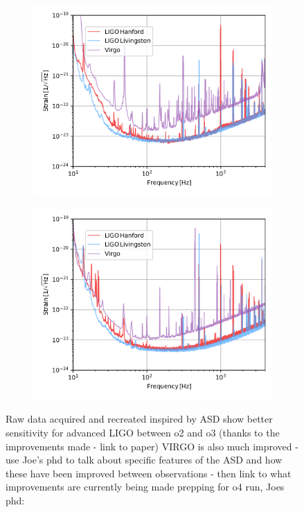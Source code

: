 \documentclass[11pt]{article}
\begin{document}
\begin{figure}[t!]
     \centering
     \begin{subfigure}[t]{0.47\linewidth}
         \centering
         \includegraphics[width=\linewidth]{shared_resources/shared_figs/o2_asd.png}
     \end{subfigure}
     \begin{subfigure}[t]{0.47\linewidth}
         \centering
         \includegraphics[width=\linewidth]{shared_resources/shared_figs/o3a_asd.png}
     \end{subfigure}
     \caption{Raw data acquired and recreated inspired by \cite{gwtc1,gwtc2} ASD show better sensitivity for advanced LIGO between o2 and o3 (thanks to the improvements made - link to paper) VIRGO is also much improved - use Joe's phd to talk about specific features of the ASD and how these have been improved between observations - then link to what improvements are currently being made prepping for o4 run, Joes phd: \cite{bayley2020phd}} 
     \label{fig:asd}
\end{figure}
\end{document}
